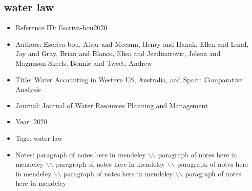 \documentclass[11pt]{article}
\begin{document}
\subsection{water law} 
\noindent\citep{Escriva-bou2020} 
\begin{itemize} 
\item{Reference ID:  Escriva-bou2020} 

\item{Authors:  Escriva-bou, Alvar and Mccann, Henry and Hanak, Ellen and Lund, Jay and Gray, Brian and Blanco, Elisa and Jezdimirovic, Jelena and Magnuson-Skeels, Bonnie and Tweet, Andrew} 

\item{Title:  Water Accounting in Western US, Australia, and Spain: Comparative Analysis} 

\item{Journal:  Journal of Water Resources Planning and Management} 

\item{Year:  2020} 

\item{Tags:  water law} 

\item{Notes:  paragraph of notes here in mendeley $\backslash$$\backslash$ paragraph of notes here in mendeley $\backslash$$\backslash$ paragraph of notes here in mendeley $\backslash$$\backslash$ paragraph of notes here in mendeley $\backslash$$\backslash$ paragraph of notes here in mendeley $\backslash$$\backslash$ paragraph of notes here in mendeley} 

\end{itemize}\medskip
\end{document}
